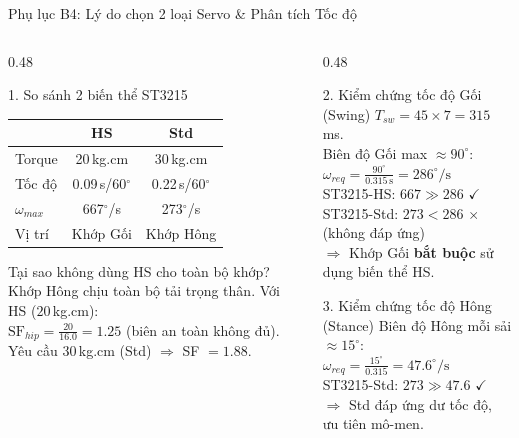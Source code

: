 \documentclass[10pt,aspectratio=169]{beamer}
\begin{document}
\begin{frame}{Phụ lục B4: Lý do chọn 2 loại Servo \& Phân tích Tốc độ}
  \small
  \begin{columns}[t]
      \begin{column}{0.48\textwidth}
          \begin{block}{1. So sánh 2 biến thể ST3215}
              \def\arraystretch{1.1}
              \centering
              \begin{tabular}{l c c}
                  \toprule
                  & \textbf{HS} & \textbf{Std} \\
                  \midrule
                  Torque & 20\,kg.cm & 30\,kg.cm \\
                  Tốc độ & 0.09\,s/60$^\circ$ & 0.22\,s/60$^\circ$ \\
                  $\omega_{max}$ & 667$^\circ$/s & 273$^\circ$/s \\
                  Vị trí & Khớp Gối & Khớp Hông \\
                  \bottomrule
              \end{tabular}
          \end{block}
          \begin{alertblock}{Tại sao không dùng HS cho toàn bộ khớp?}
              {\footnotesize Khớp Hông chịu toàn bộ tải trọng thân. Với HS ($20\,$kg.cm):\\
              $\text{SF}_{hip} = \frac{20}{16.0} = 1.25$ (biên an toàn không đủ).\\
              Yêu cầu $30\,$kg.cm (Std) $\Rightarrow$ SF $= 1.88$.}
          \end{alertblock}
      \end{column}
      \begin{column}{0.48\textwidth}
          \begin{block}{2. Kiểm chứng tốc độ Gối (Swing)}
              $T_{sw} = 45 \times 7 = 315\,$ms.\\
              Biên độ Gối max $\approx 90^\circ$:\\
              $\omega_{req} = \frac{90^\circ}{0.315\,\text{s}} = 286^\circ/\text{s}$\\[0.1cm]
              ST3215-HS: $667 \gg 286$ $\checkmark$\\
              ST3215-Std: $273 < 286$ $\times$ {\footnotesize (không đáp ứng)}\\
              $\Rightarrow$ Khớp Gối \textbf{bắt buộc} sử dụng biến thể HS.
          \end{block}
          \begin{block}{3. Kiểm chứng tốc độ Hông (Stance)}
              Biên độ Hông mỗi sải $\approx 15^\circ$:\\
              $\omega_{req} = \frac{15^\circ}{0.315} = 47.6^\circ/\text{s}$\\
              ST3215-Std: $273 \gg 47.6$ $\checkmark$\\
              $\Rightarrow$ Std đáp ứng dư tốc độ, ưu tiên mô-men.
          \end{block}
      \end{column}
  \end{columns}
\end{frame}
\end{document}
